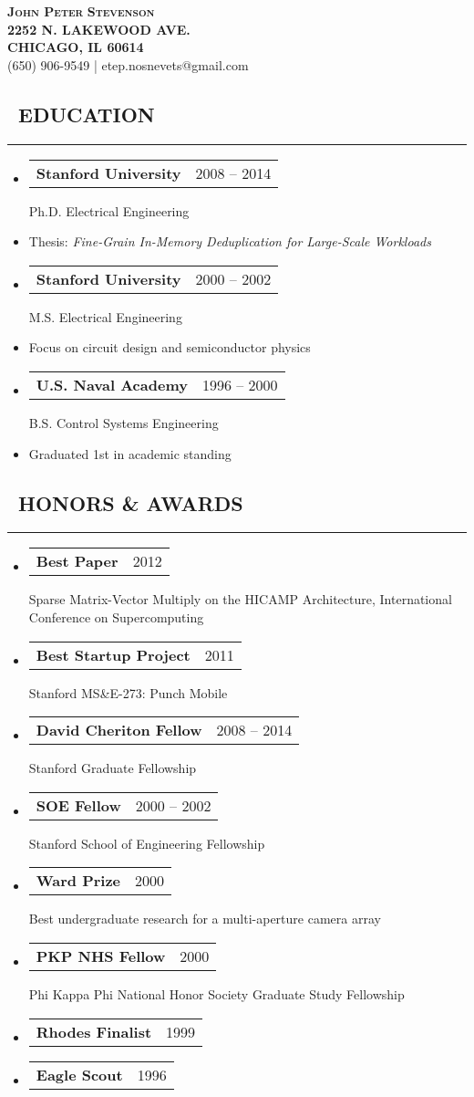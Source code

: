 \documentclass[10pt,letterpaper]{article}
\makeatletter
\newenvironment{resumesection}[1]
{%
    \subsection*{\ \textcolor{light-gray}{#1} }
    \vspace{-0.4em}
    \begin{samepage}
    \hrule
    \end{samepage}
    \vspace{+0.4em}
    \begin{itemize}[leftmargin=0.15cm]
        \parskip=0.1em
}%
{%
    \end{itemize}
}%
\newcommand{\myitem}[1] {
    \item[] \textcolor{dark-gray}{#1}
}
\newcommand{\headertri}[3] {
    \item[] \begin{tabular*}{\linewidth}{l@{\extracolsep{\fill}}r}
    \textbf{#1} & #2 \\
    \end{tabular*}
    #3
}
\newcommand{\lminiw}{0.375}
\makeatother
\begin{document}
\begin{center}
{\huge{ \textsc{ { {\bfseries John Peter} {\bfseries Stevenson} }}}} \\
\vspace{0.5em}
\textcolor{light-gray}{
\footnotesize{\textbf{2252 N. LAKEWOOD AVE.}}  \\
\footnotesize{\textbf{CHICAGO, IL 60614    }}  \\
\footnotesize{{(650) 906-9549} | {etep.nosnevets@gmail.com}}
}
\end{center}

\begin{minipage}[t]{\lminiw\textwidth}
\begin{resumesection}{EDUCATION}
    \headertri
    {Stanford University}
    {2008 -- 2014}
    {Ph.D. Electrical Engineering}
    \myitem
    {Thesis: \textit{Fine-Grain In-Memory Deduplication for Large-Scale Workloads}}

    \headertri
    {Stanford University}
    {2000 -- 2002}
    {M.S. Electrical Engineering}
    \myitem
    {Focus on circuit design and semiconductor physics}

    \headertri
    {U.S. Naval Academy}
    {1996 -- 2000}
    {B.S. Control Systems Engineering}
    \myitem
    {Graduated 1st in academic standing}
\end{resumesection}

\begin{resumesection}{HONORS \& AWARDS}
    \headertri
    {Best Paper}
    {2012}
    {Sparse Matrix-Vector Multiply on the {{HICAMP}} Architecture, International Conference on Supercomputing}

    \headertri
    {Best Startup Project}
    {2011}
    {Stanford MS\&E-273: Punch Mobile}

    \headertri
    {David Cheriton Fellow}
    {2008 -- 2014}
    {Stanford Graduate Fellowship}

    \headertri
    {SOE Fellow}
    {2000 -- 2002}
    {Stanford School of Engineering Fellowship}

    \headertri
    {Ward Prize}
    {2000}
    {Best undergraduate research for a multi-aperture camera array}

    \headertri
    {PKP NHS Fellow}
    {2000}
    {Phi Kappa Phi National Honor Society Graduate Study Fellowship}

    \headertri
    {Rhodes Finalist}
    {1999}
    {}

    \headertri
    {Eagle Scout}
    {1996}
    {}
\end{resumesection}

\end{minipage}
\end{document}
